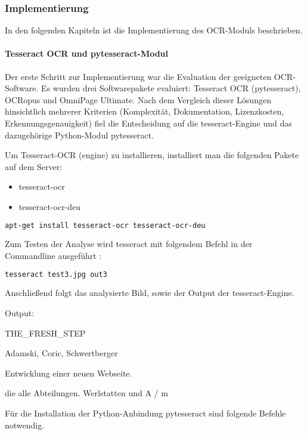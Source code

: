 \subsubsection{Implementierung}
In den folgenden Kapiteln ist die Implementierung des OCR-Moduls beschrieben.
\paragraph{Tesseract OCR und pytesseract-Modul}
Der erste Schritt zur Implementierung war die Evaluation der geeigneten OCR-Software. Es wurden drei Softwarepakete evaluiert: Tesseract OCR (pytesseract), OCRopus und OmniPage Ultimate. Nach dem Vergleich dieser Lösungen hinsichtlich mehrerer Kriterien (Komplexität, Dokumentation, Lizenzkosten, Erkennungsgenauigkeit) fiel die Entscheidung auf die tesseract-Engine und das dazugehörige Python-Modul pytesseract.

Um Tesseract-OCR (engine) zu installieren, installiert man die folgenden Pakete auf dem Server:
\begin{itemize}
\item tesseract-ocr
\item tesseract-ocr-deu
\end{itemize}

\begin{lstlisting}[caption={tesseract-Installation}, language=bash]
apt-get install tesseract-ocr tesseract-ocr-deu
\end{lstlisting}

\newpage

Zum Testen der Analyse wird tesseract mit folgendem Befehl in der Commandline ausgeführt \cite{TESS1, TESS2}:
\begin{lstlisting}[caption={tesseract-Ausführung}, language=bash]
tesseract test3.jpg out3
\end{lstlisting}

Anschließend folgt das analysierte Bild, sowie der Output der tesseract-Engine.


Output:

THE\_FRESH\_STEP

Adamski, Coric, Schwertberger

Entwicklung einer neuen Webseite.

die alle Abteilungen. Werlstatten und A / m

Für die Installation der Python-Anbindung pytesseract sind folgende Befehle notwendig. \cite{PYTES, PYTES2, PYTES3}

